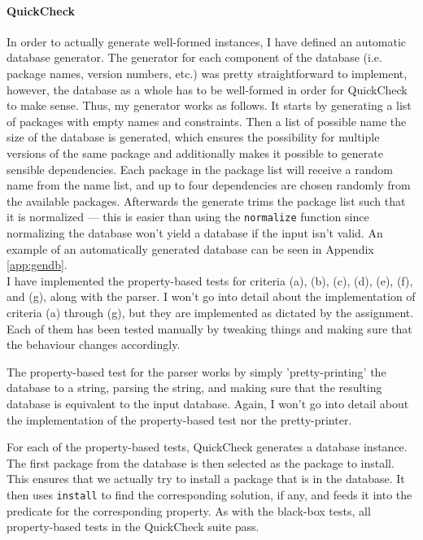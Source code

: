 \paragraph{QuickCheck}
In order to actually generate well-formed instances, I have defined an automatic database generator. The generator for each component of the database (i.e. package names, version numbers, etc.) was pretty straightforward to implement, however, the database as a whole has to be well-formed in order for QuickCheck to make sense. Thus, my generator works as follows. It starts by generating a list of packages with empty names and constraints. Then a list of possible name the size of the database is generated, which ensures the possibility for multiple versions of the same package and additionally makes it possible to generate sensible dependencies. Each package in the package list will receive a random name from the name list, and up to four dependencies are chosen randomly from the available packages. Afterwards the generate trims the package list such that it is normalized --- this is easier than using the \texttt{normalize} function since normalizing the database won't yield a database if the input isn't valid. An example of an automatically generated database can be seen in Appendix \ref{app:gendb}. \\

\noindent I have implemented the property-based tests for criteria (a), (b), (c), (d), (e), (f), and (g), along with the parser. I won't go into detail about the implementation of criteria (a) through (g), but they are implemented as dictated by the assignment. Each of them has been tested manually by tweaking things and making sure that the behaviour changes accordingly.

The property-based test for the parser works by simply 'pretty-printing' the database to a string, parsing the string, and making sure that the resulting database is equivalent to the input database. Again, I won't go into detail about the implementation of the property-based test nor the pretty-printer.

For each of the property-based tests, QuickCheck generates a database instance. The first package from the database is then selected as the package to install. This ensures that we actually try to install a package that is in the database. It then uses \texttt{install} to find the corresponding solution, if any, and feeds it into the predicate for the corresponding property. As with the black-box tests, all property-based tests in the QuickCheck suite pass.


